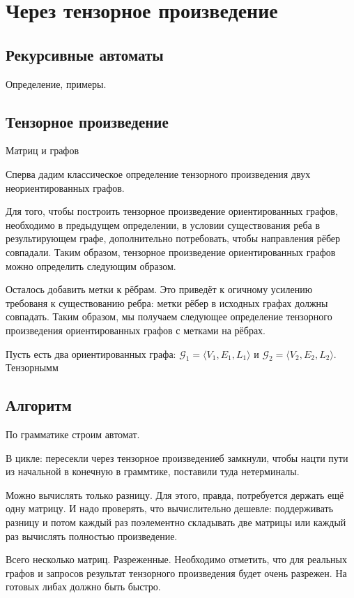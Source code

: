 \section{Через тензорное произведение}

\subsection{Рекурсивные автоматы}

Определение, примеры.

\subsection{Тензорное произведение}

Матриц и графов

Сперва дадим классическое определение тензорного произведения двух неориентированных графов.
\begin{definition}

\end{definition}

Для того, чтобы построить тензорное произведение ориентированных графов, необходимо в предыдущем определении, в условии существования реба в результирующем графе, дополнительно потребовать, чтобы направления рёбер совпадали.
Таким образом, тензорное произведение ориентированных графов можно определить следующим образом.
\begin{definition}

\end{definition}

Осталось добавить метки к рёбрам.
Это приведёт к огичному усилению требованя к существованию ребра: метки рёбер в исходных графах должны совпадать.
Таким образом, мы получаем следующее определение тензорного произведения ориентированных графов с метками на рёбрах.
\begin{definition}

Пусть есть два ориентированных графа: $\mathcal{G}_1 = \langle V_1, E_1, L_1 \rangle$ и $\mathcal{G}_2 = \langle V_2, E_2, L_2 \rangle$.
Тензорнымм

\end{definition}


\subsection{Алгоритм}

По грамматике строим автомат.

В цикле: пересекли через тензорное произведениеб замкнули, чтобы нацти пути из начальной в конечную в граммтике, поставили туда нетерминалы.

Можно вычислять только разницу.
Для этого, правда, потребуется держать ещё одну матрицу.
И надо проверять, что вычислительно дешевле: поддерживать разницу и потом каждый раз поэлементно складывать две матрицы или каждый раз вычислять полностью произведение.

Всего несколько матриц.
Разреженные.
Необходимо отметить, что для реальных графов и запросов результат тензорного произведения будет очень разрежен.
На готовых либах должно быть быстро.
